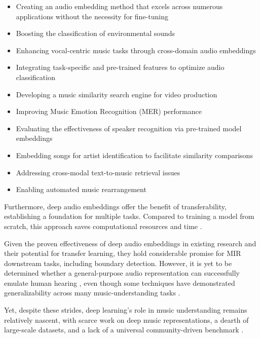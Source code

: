 \begin{itemize}
\item Creating an audio embedding method that excels across numerous applications without the necessity for fine-tuning \cite{Turian2022HEAR:Representations}
\item Boosting the classification of environmental sounds \cite{CramerLOOKEMBEDDINGS}
\item Enhancing vocal-centric music tasks through cross-domain audio embeddings \cite{Kim2021LearningLoss}
\item Integrating task-specific and pre-trained features to optimize audio classification \cite{Hung2022Feature-informedClassification}
\item Developing a music similarity search engine for video production \cite{epidemic}
\item Improving Music Emotion Recognition (MER) performance \cite{KohComparisonRecognition}
\item Evaluating the effectiveness of speaker recognition via pre-trained model embeddings \cite{lightweight}
\item Embedding songs for artist identification to facilitate similarity comparisons \cite{contentmusicsimtriplet2020}
\item Addressing cross-modal text-to-music retrieval issues \cite{WonEmotionStories}
\item Enabling automated music rearrangement \cite{Stoller2018IntuitiveTransitions, Plachouras2023MusicSegmentation}
\end{itemize}

Furthermore, deep audio embeddings offer the benefit of transferability, establishing a foundation for multiple tasks. Compared to training a model from scratch, this approach saves computational resources and time \cite{transferMIR2013, CifkaDeepTransfer}.

Given the proven effectiveness of deep audio embeddings in existing research and their potential for transfer learning, they hold considerable promise for MIR downstream tasks, including boundary detection. However, it is yet to be determined whether a general-purpose audio representation can successfully emulate human hearing \cite{Turian2022HEAR:Representations}, even though some techniques have demonstrated generalizability across many music-understanding tasks \cite{Li2023MERT:Training, Kim2020OneStrategies}.

Yet, despite these strides, deep learning's role in music understanding remains relatively nascent, with scarce work on deep music representations, a dearth of large-scale datasets, and a lack of a universal community-driven benchmark \cite{Turian2022HEAR:Representations, Yuan2023MARBLE:Evaluation}.